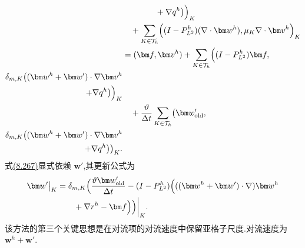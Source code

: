 \begin{note}
\begin{equation}
\begin{aligned}
 &\qquad\qquad+\nabla q^h\bigr)
    \Bigr)_K\\
 &\quad+\sum_{K\in\mathcal T_h}\Bigl(
    (I-P^h_{L^2})(\nabla\cdot\bm w^h),
    \mu_K\nabla\cdot\bm v^h\Bigr)_K\\
 &=(\bm f,\bm v^h)
   +\sum_{K\in\mathcal T_h}\Bigl(
      (I-P^h_{L^2})\bm f,\\
      \delta_{m,K}\bigl((\bm w^h+\bm w')\cdot\nabla\bm v^h\\
      +\nabla q^h\bigr)
      \Bigr)_K\\
 &\quad+\frac{\vartheta}{\Delta t}\sum_{K\in\mathcal T_h}
      \bigl(\bm w'_{\mathrm{old}},\\
       \delta_{m,K}\bigl((\bm w^h+\bm w')\cdot\nabla\bm v^h\\
       +\nabla q^h\bigr)\bigr)_K.
\end{aligned}
\end{equation}
式\hyperref[eq:vms-oss-resolved-scale-method]{(8.267)}显式依赖 $\bm w'$,其更新公式为
\begin{equation}\label{eq:vms-oss-subscale-update}
 \begin{aligned}
 \bm w'\big|_K
 &=\delta_{m,K}\Bigl(
   \frac{\vartheta\bm w'_{\mathrm{old}}}{\Delta t}
   -(I-P^h_{L^2})\Bigl(((\bm w^h+\bm w')\cdot\nabla)\bm w^h\\
 &\qquad+\nabla r^h-\bm f\Bigr)\Bigr)\bigg|_K.
 \end{aligned}
\end{equation}
该方法的第三个关键思想是在对流项的对流速度中保留亚格子尺度.对流速度为 $\bm w^h+\bm w'$.
\end{note}

